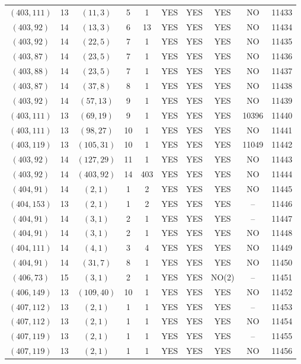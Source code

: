 \begin{longtable}{|c|c|c|c|c|c|c|c|c|c|}
$(403, 111)$ & 13 & $(11, 3)$ & 5 & 1 & YES & YES & YES & NO & 11433\\
$(403, 92)$ & 14 & $(13, 3)$ & 6 & 13 & YES & YES & YES & NO & 11434\\
$(403, 92)$ & 14 & $(22, 5)$ & 7 & 1 & YES & YES & YES & NO & 11435\\
$(403, 87)$ & 14 & $(23, 5)$ & 7 & 1 & YES & YES & YES & NO & 11436\\
$(403, 88)$ & 14 & $(23, 5)$ & 7 & 1 & YES & YES & YES & NO & 11437\\
$(403, 87)$ & 14 & $(37, 8)$ & 8 & 1 & YES & YES & YES & NO & 11438\\
$(403, 92)$ & 14 & $(57, 13)$ & 9 & 1 & YES & YES & YES & NO & 11439\\
$(403, 111)$ & 13 & $(69, 19)$ & 9 & 1 & YES & YES & YES & 10396 & 11440\\
$(403, 111)$ & 13 & $(98, 27)$ & 10 & 1 & YES & YES & YES & NO & 11441\\
$(403, 119)$ & 13 & $(105, 31)$ & 10 & 1 & YES & YES & YES & 11049 & 11442\\
$(403, 92)$ & 14 & $(127, 29)$ & 11 & 1 & YES & YES & YES & NO & 11443\\
$(403, 92)$ & 14 & $(403, 92)$ & 14 & 403 & YES & YES & YES & NO & 11444\\
$(404, 91)$ & 14 & $(2, 1)$ & 1 & 2 & YES & YES & YES & NO & 11445\\
$(404, 153)$ & 13 & $(2, 1)$ & 1 & 2 & YES & YES & YES & -- & 11446\\
$(404, 91)$ & 14 & $(3, 1)$ & 2 & 1 & YES & YES & YES & -- & 11447\\
$(404, 91)$ & 14 & $(3, 1)$ & 2 & 1 & YES & YES & YES & NO & 11448\\
$(404, 111)$ & 14 & $(4, 1)$ & 3 & 4 & YES & YES & YES & NO & 11449\\
$(404, 91)$ & 14 & $(31, 7)$ & 8 & 1 & YES & YES & YES & NO & 11450\\
$(406, 73)$ & 15 & $(3, 1)$ & 2 & 1 & YES & YES & NO(2) & -- & 11451\\
$(406, 149)$ & 13 & $(109, 40)$ & 10 & 1 & YES & YES & YES & NO & 11452\\
$(407, 112)$ & 13 & $(2, 1)$ & 1 & 1 & YES & YES & YES & -- & 11453\\
$(407, 112)$ & 13 & $(2, 1)$ & 1 & 1 & YES & YES & YES & NO & 11454\\
$(407, 119)$ & 13 & $(2, 1)$ & 1 & 1 & YES & YES & YES & -- & 11455\\
$(407, 119)$ & 13 & $(2, 1)$ & 1 & 1 & YES & YES & YES & NO & 11456\\

\end{longtable}
